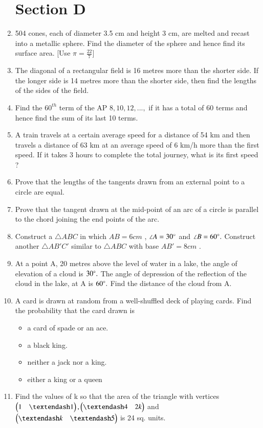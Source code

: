 \documentclass[journal,12pt,twocolumn]{IEEEtran}
\begin{document}
\begin{enumerate}
\section{Section D} 
 \item 504 cones, each of diameter 3.5 cm and height 3 cm, are melted and recast into a metallic sphere. Find the diameter of the sphere and hence find its surface area. [Use $\pi=\frac{22}{7}$]
 \item The diagonal of a rectangular field is 16 metres more than the shorter side. If the longer side is 14 metres more than the shorter side, then find the lengths of the sides of the field.
 \item Find the $60^{th}$ term of the AP $8, 10, 12, ...,$ if it has a total of 60 terms and hence find the sum of its last 10 terms.
 \item A train travels at a certain average speed for a distance of 54 km and then travels a distance of 63 km at an average speed of 6 km/h more than the first speed. If it takes 3 hours to complete the total journey, what is its first speed ?
 \item Prove that the lengths of the tangents drawn from an external point to a circle are equal.
 \item Prove that the tangent drawn at the mid-point of an arc of a circle is parallel to the chord joining the end points of the arc.
 \item  Construct a $\triangle ABC $ in which $ AB = 6 cm $ , $\angle A = 30\degree $ and $\angle B = 60\degree.$ Construct another $\triangle AB'C' $ similar to $\triangle ABC $ with base $AB' = 8 cm $ .
 \item At a point A, 20 metres above the level of water in a lake, the angle of elevation of a cloud is $30 \degree.$ The angle of depression of the reflection of the cloud in the lake, at A is $60\degree .$ Find the distance of the cloud from A.
 \item A card is drawn at random from a well-shuffled deck of playing cards. Find the probability that the card drawn is
 \begin{itemize}
     \item a card of spade or an ace.
     \item a black king. 
     \item neither a jack nor a king.
     \item either a king or a queen
 \end{itemize}
 \item Find the values of k so that the area of the triangle with vertices $\myvec{1 &– 1}, \myvec{– 4 & 2k} $ and $\myvec{–k & –5}$ is 24 sq. units.

\end{enumerate}
\end{document}
